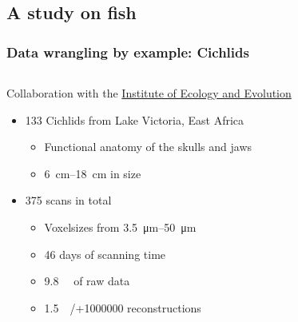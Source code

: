 \subsection{A study on fish}
\begin{frame}
	\frametitle{Data wrangling by example: Cichlids}
	\begin{columns}
		\begin{column}{0.5\linewidth}
			Collaboration with the \href{https://www.aqua.iee.unibe.ch/}{Institute of Ecology and Evolution}~\cite{Haberthuer2023}
			\begin{itemize}
				\item 133 Cichlids from Lake Victoria, East Africa
				\begin{itemize}
					\item Functional anatomy of the skulls and jaws
					\item \qtyrange{6}{18}{\centi\meter} in size
				\end{itemize}
				\item 375 scans in total
				\begin{itemize}
					\item Voxelsizes from \qtyrange{3.5}{50}{\micro\meter}
					\item 46 days of scanning time
					\item \qty{9.8}{\tera\byte} of raw data
					\item \qty{1.5}{\tera\byte}/+\num{1000000} reconstructions
				\end{itemize}
			\end{itemize}
		\end{column}
		\begin{column}{0.5\linewidth}
			\centering%
\end{column}
\end{columns}
\end{frame}
